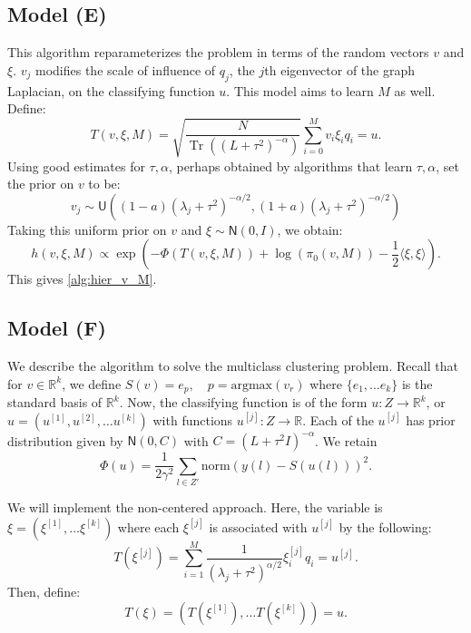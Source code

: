 \documentclass{siamart1116}
\DeclareMathOperator{\Tr}{Tr}
\begin{document}
    \subsection{Model (E)} \label{sec:algorithms_model_e}
        This algorithm reparameterizes the problem in terms of the random vectors $v$ and $\xi$. $v_j$ modifies the scale of influence of $q_j$, the $j$th eigenvector of the graph Laplacian, on the classifying function $u$. This model aims to learn $M$ as well. Define:
        \begin{equation}
        T(v,\xi,M) = \sqrt{\frac{N}{\Tr ((L + \tau^2)^{-\alpha}) }} \sum_{i=0}^{M} v_i\xi_iq_i = u.
        \end{equation}
        Using good estimates for $\tau, \alpha$, perhaps obtained by algorithms that learn $\tau, \alpha$, set the prior on $v$ to be:
        \[v_j \sim \mathsf{U}\left((1-a)(\lambda_j+\tau^2)^{-\alpha/2},(1+a)(\lambda_j+\tau^2)^{-\alpha/2}\right)\]
        Taking this uniform prior on $v$ and $\xi \sim \mathsf{N}(0, I)$, we obtain:
        \begin{equation}
        \label{eqn:learn_v_M_posterior}
        h(v, \xi, M) \propto \exp \left(-\Phi(T(v,\xi, M)) + \log (\pi_0(v, M)) - \frac{1}{2}\langle \xi, \xi \rangle  \right).
        \end{equation}
        This gives \cref{alg:hier_v_M}.
        
    \subsection{Model (F)} \label{sec:algorithms_multiclass}
        We describe the algorithm to solve the multiclass clustering problem. Recall that for $v \in \mathbb{R}^k$, we define $S(v) = e_p, \quad p = \text{argmax} (v_r)$ where $\{e_1, \ldots e_k\}$ is the standard basis of $\mathbb{R}^k$. Now, the classifying function is of the form $u: Z \to \mathbb{R}^k$, or $u = (u^{[1]}, u^{[2]}, \ldots u^{[k]})$ with functions $u^{[j]}: Z \to \mathbb{R}$. Each of the $u^{[j]}$ has prior distribution given by $\mathsf{N}(0, C)$ with $C = (L + \tau^2 I)^{-\alpha}$. We retain
        \[ \Phi(u) = \frac{1}{2\gamma^2}\sum_{l \in Z'} \text{norm}(y(l) - S(u(l)))^2. \]

        We will implement the non-centered approach. Here, the variable is $\xi = (\xi^{[1]}, \ldots \xi^{[k]})$ where each $\xi^{[j]}$ is associated with $u^{[j]}$ by the following:
        \[T(\xi^{[j]}) = \sum_{i=1}^M \frac{1}{(\lambda_j + \tau^2)^{\alpha/2}} \xi^{[j]}_i q_i = u^{[j]}.\]
        Then, define:
        \begin{equation}
        \label{eqn:multiclass_T}
        T(\xi) = (T(\xi^{[1]}), \ldots T(\xi^{[k]}) ) = u.
        \end{equation}
\end{document}
